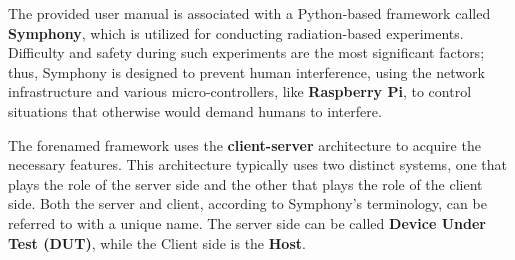 The provided user manual is associated with a Python-based framework called \textbf{Symphony}, which is utilized for conducting radiation-based experiments. Difficulty and safety during such experiments are the most significant factors; thus, Symphony is designed to prevent human interference, using the network infrastructure and various micro-controllers, like \textbf{Raspberry Pi}, to control situations that otherwise would demand humans to interfere. 

The forenamed framework uses the \textbf{client-server} architecture to acquire the necessary features. This architecture typically uses two distinct systems, one that plays the role of the server side and the other that plays the role of the client side. Both the server and client, according to Symphony's terminology, can be referred to with a unique name. The server side can be called \textbf{Device Under Test (DUT)}, while the Client side is the \textbf{Host}. 